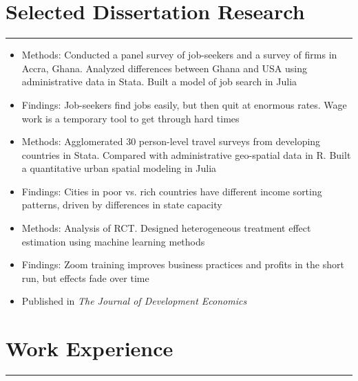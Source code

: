 \documentclass[10pt]{article}
\newenvironment{customitemize}
{ \begin{itemize}[leftmargin=\parindent, topsep = 0.2pt, itemsep = -3pt] }
{\end{itemize} }
\begin{document}
\section*{Selected Dissertation Research}
\noindent \rule{\textwidth}{1pt} 
\begin{customitemize}
\item Methods: Conducted a panel survey of job-seekers and a survey of firms in Accra, Ghana. Analyzed differences between Ghana and USA using administrative data in Stata. Built a model of job search in Julia
\item Findings: Job-seekers find jobs easily, but then quit at enormous rates. Wage work is a temporary tool to get through hard times 
\end{customitemize}
\begin{customitemize}
	\item Methods: Agglomerated 30 person-level travel surveys from developing countries in Stata. Compared with administrative geo-spatial data in R. Built a quantitative urban spatial modeling in Julia
	\item Findings: Cities in poor vs. rich countries have different income sorting patterns, driven by differences in state capacity
\end{customitemize}
\begin{customitemize}
	\item Methods: Analysis of RCT. Designed heterogeneous treatment effect estimation using machine learning methods
	\item Findings: Zoom training improves business practices and profits in the short run, but effects fade over time
	\item Published in \textit{The Journal of Development Economics}
\end{customitemize}

\section*{Work Experience} 
\noindent \rule{\textwidth}{1pt} 
\end{document}
